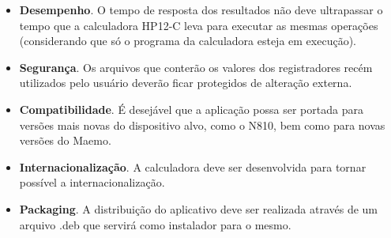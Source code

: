 \begin{itemize}
\begin{itemize}
	 \item \textbf{Desempenho}. O tempo de resposta dos resultados não deve ultrapassar o tempo que a calculadora HP12-C leva para executar as mesmas operações (considerando que só o programa da calculadora esteja em execução).
	 \item \textbf{Segurança}. Os arquivos que conterão os valores dos registradores recém utilizados pelo usuário deverão ficar protegidos de alteração externa.
	 \item \textbf{Compatibilidade}. É desejável que a aplicação possa ser portada para versões mais novas do dispositivo alvo, como o N810, bem como para novas versões do Maemo.
	 \item \textbf{Internacionalização}. A calculadora deve ser desenvolvida para tornar possível a internacionalização. 
	 \item \textbf{Packaging}. A distribuição do aplicativo deve ser realizada através de um arquivo .deb que servirá como instalador para o mesmo.
	\end{itemize}
\end{itemize}
